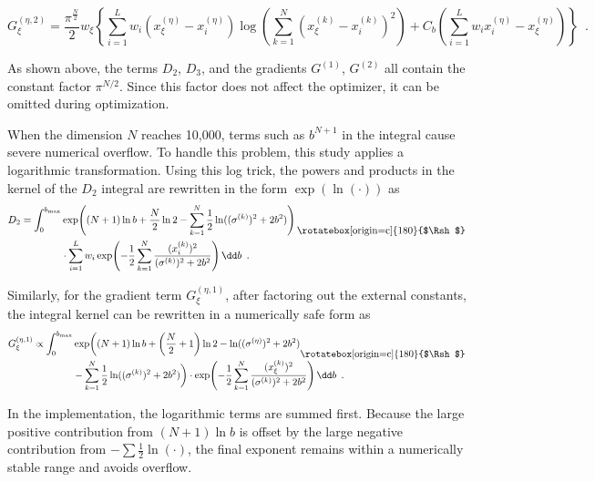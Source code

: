 \begin{equation}
	G_\xi^{(\eta, 2)} = \frac{\pi^{\frac{N}{2}}}{2} w_\xi \left\{ \sum_{i=1}^L w_i (x_\xi^{(\eta)} - x_i^{(\eta)}) \log\left( \sum_{k=1}^N (x_\xi^{(k)} - x_i^{(k)})^2 \right) + C_b \left( \sum_{i=1}^L w_i x_i^{(\eta)} - x_\xi^{(\eta)} \right) \right\} \enspace .
\end{equation}

As shown above, the terms $D_2$, $D_3$, and the gradients $G^{(1)}$, $G^{(2)}$ all contain the constant factor $\pi^{N/2}$. Since this factor does not affect the optimizer, it can be omitted during optimization.

When the dimension $N$ reaches 10,000, terms such as $b^{N+1}$ in the integral cause severe numerical overflow. To handle this problem, this study applies a logarithmic transformation. Using this log trick, the powers and products in the kernel of the $D_2$ integral are rewritten in the form $\exp(\ln(\cdot))$ as
\begin{equation}
	\begin{split}
		D_2 = \int_0^{b_{\text{max}}} &\exp\!\left( (N+1)\ln b + \frac{N}{2}\ln 2 - \sum_{k=1}^N \frac{1}{2} \ln((\sigma^{(k)})^2 + 2b^2) \right) \text{\raisebox{-.7\baselineskip}[0pt][0pt]{\rotatebox[origin=c]{180}{$\Rsh$}}} \\
		&\cdot \sum_{i=1}^L w_i \exp\!\left( -\frac{1}{2} \sum_{k=1}^N \frac{(x_i^{(k)})^2}{(\sigma^{(k)})^2 + 2b^2} \right) \dd b \enspace .
	\end{split}
\end{equation}

Similarly, for the gradient term $G_\xi^{(\eta, 1)}$, after factoring out the external constants, the integral kernel can be rewritten in a numerically safe form as
\begin{equation}
	\begin{split}
		G_\xi^{(\eta, 1)} \propto \int_0^{b_{\text{max}}} & \exp\! \bigg( (N+1)\ln b + \left(\frac{N}{2}+1\right)\ln 2 - \ln((\sigma^{(\eta)})^2 + 2b^2) \text{\raisebox{-.7\baselineskip}[0pt][0pt]{\rotatebox[origin=c]{180}{$\Rsh$}}} \\
		& - \sum_{k=1}^N \frac{1}{2} \ln((\sigma^{(k)})^2 + 2b^2) \bigg) \cdot \exp\!\left( -\frac{1}{2} \sum_{k=1}^N \frac{(x_\xi^{(k)})^2}{(\sigma^{(k)})^2 + 2b^2} \right) \dd b \enspace .
	\end{split}
\end{equation}

In the implementation, the logarithmic terms are summed first. Because the large positive contribution from $(N+1)\ln b$ is offset by the large negative contribution from $-\sum \frac{1}{2}\ln(\cdot)$, the final exponent remains within a numerically stable range and avoids overflow.

